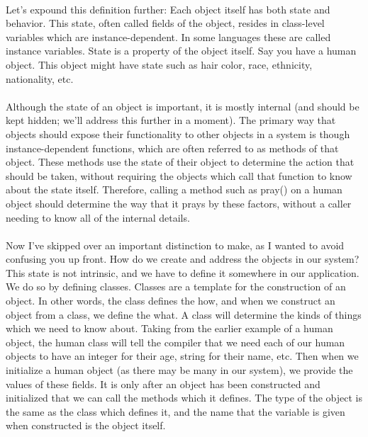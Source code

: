 \documentclass{article}
\begin{document}
\paragraph{}
Let’s expound this definition further: Each object itself has both state and
behavior. This state, often called fields of the object, resides in class-level
variables which are instance-dependent. In some languages these are called
instance variables. State is a property of the object itself. Say you have a
human object. This object might have state such as hair color, race, ethnicity,
nationality, etc.
\paragraph{}
Although the state of an object is important, it is mostly internal (and should
be kept hidden; we'll address this further in a moment). The primary way that
objects should expose their functionality to other objects in a system is though 
instance-dependent functions, which are often referred to as methods of that
object. These methods use the state of their object to determine the action that 
should be taken, without requiring the objects which call that function to know
about the state itself. Therefore, calling a method such as pray() on a human
object should determine the way that it prays by these factors, without a caller 
needing to know all of the internal details.
\paragraph{}
Now I've skipped over an important distinction to make, as I wanted to avoid
confusing you up front. How do we create and address the objects in our system?
This state is not intrinsic, and we have to define it somewhere in our
application. We do so by defining classes. Classes are a template for the
construction of an object. In other words, the class defines the how, and when
we construct an object from a class, we define the what. A class will determine
the kinds of things which we need to know about. Taking from the earlier example 
of a human object, the human class will tell the compiler that we need each of
our human objects to have an integer for their age, string for their name, etc.
Then when we initialize a human object (as there may be many in our system), we
provide the values of these fields. It is only after an object has been
constructed and initialized that we can call the methods which it defines. The
type of the object is the same as the class which defines it, and the name that
the variable is given when constructed is the object itself.
\end{document}
